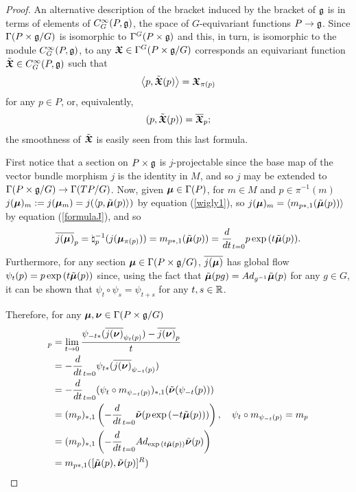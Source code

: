 \begin{proof}
An alternative description of the bracket induced by the bracket of $\mathfrak{g}$ is in terms of elements of $C^\infty_G(P, \mathfrak{g})$, the space of $G$-equivariant functions $P \to \mathfrak{g}$. Since $\Gamma(P \times \mathfrak{g}/G)$ is isomorphic to $\Gamma^G(P \times \mathfrak{g})$ and this, in turn, is isomorphic to the module $C^\infty_G(P, \mathfrak{g})$, to any $\bm{\mathfrak{X}} \in \Gamma^G(P \times \mathfrak{g}/G)$ corresponds an equivariant function $\Tilde{\bm{\mathfrak{X}}} \in C^\infty_G(P, \mathfrak{g})$ such that
\begin{align} \label{wigly1}
    \left\langle p, \Tilde{\bm{\mathfrak{X}}}(p) \right\rangle = \bm{\mathfrak{X}}_{\pi(p)} 
\end{align}
for any $p \in P$, or, equivalently,
\begin{align}\label{wigly2}
    (p, \Tilde{\bm{\mathfrak{X}}}(p)) = \overline{\bm{\mathfrak{X}}}_{p};
\end{align} the smoothness of $\Tilde{\bm{\mathfrak{X}}}$ is easily seen from this last formula.

First notice that a section on $P \times \mathfrak{g}$ is $j$-projectable since the base map of the vector bundle morphism $j$ is the identity in $M$, and so $j$ may be extended to $\Gamma(P \times \mathfrak{g}/G) \to \Gamma(TP/G)$. Now, given $\bm{\mu} \in \Gamma(P)$, for $m \in M$ and $p \in \pi^{-1}(m)$ $j(\bm{\mu})_m := j(\bm{\mu}_m) = j(\left\langle p, \Tilde{\bm{\mu}}(p) \right\rangle)$ by equation (\ref{wigly1}), so $j(\bm{\mu})_m = \left\langle m_{p*, 1}(\Tilde{\bm{\mu}}(p)) \right\rangle$ by equation (\ref{formulaJ}), and so
\begin{align}
    \overline{j(\bm{\mu})}_p = \natural_p^{-1}(j(\bm{\mu}_{\pi(p)})) = m_{p*,1}(\Tilde{\bm{\mu}}(p)) = \frac{d}{dt}_{t=0} p \exp{(t \Tilde{\ensuremath{\bm{\mu}}}(p))}.
\end{align}
Furthermore, for any section $\bm{\mu} \in \Gamma(P \times \mathfrak{g}/G)$, $\overline{j(\bm{\mu})}$ has global flow $\psi_t(p) = p \exp{(t \Tilde{\ensuremath{\bm{\mu}}}(p))}$ since, using the fact that $\Tilde{\bm{\mu}}(pg) = Ad_{g^{-1}} \Tilde{\bm{\mu}}(p)$ for any $g \in G$, it can be shown that $\psi_t \circ \psi_s = \psi_{t + s}$ for any $t, s \in \mathbb{R}$.

Therefore, for any $\bm{\mu}, \bm{\nu} \in \Gamma(P \times \mathfrak{g}/ G)$
\begin{align*}
    [\upsect{j(\sect \mu)}, \upsect{j(\sect \nu)}]_p 
    &= \lim_{t \to 0} \frac{\psi_{-t*}(\upsect{j(\sect \nu)}_{\psi_t(p)})  - \upsect{j(\sect \nu)}_{p} }{t}\\
    &= - \frac{d}{dt}_{t = 0} \psi_{t*} (\upsect{j(\sect \nu)}_{\psi_{-t}(p)}) \\
    &= - \frac{d}{dt}_{t = 0} (\psi_{t} \circ m_{\psi_{-t}(p)})_{*, 1} (\Tilde{\sect \nu}(\psi_{-t}(p)))\\
    &= (m_{p})_{*, 1} \left(- \frac{d}{dt}_{t = 0} \Tilde{\sect \nu}(p \exp{(-t \Tilde{\sect \mu}(p))}) \right), \quad \psi_t \circ m_{\psi_{-t}(p)} = m_p \\
    &= (m_{p})_{*, 1} \left(- \frac{d}{dt}_{t = 0} Ad_{\exp{(t \Tilde{\sect \mu}(p))}}\Tilde{\sect \nu}(p) \right) \\
    &= m_{p*, 1} ([\Tilde{\sect \mu}(p), \Tilde{\sect \nu}(p)]^R)
\end{align*}


\end{proof}

